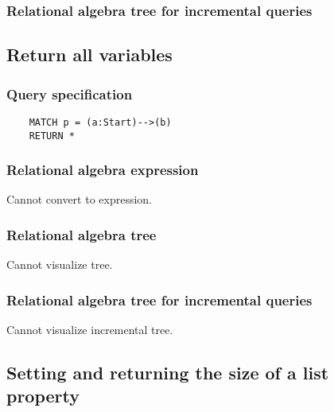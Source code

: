 	\subsubsection*{Relational algebra tree for incremental queries}

	\subsection{Return all variables}

	\subsubsection*{Query specification}

	\begin{lstlisting}
	MATCH p = (a:Start)-->(b)
	RETURN *
	\end{lstlisting}


	\subsubsection*{Relational algebra expression}

	Cannot convert to expression.

	\subsubsection*{Relational algebra tree}

	Cannot visualize tree.

	\subsubsection*{Relational algebra tree for incremental queries}

	Cannot visualize incremental tree.
	\subsection{Setting and returning the size of a list property}

